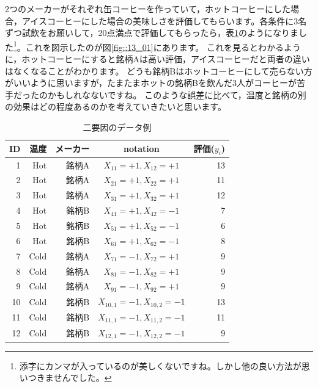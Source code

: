 \documentclass{ltjbook}
\begin{document}
2つのメーカーがそれぞれ缶コーヒーを作っていて，ホットコーヒーにした場合，アイスコーヒーにした場合の美味しさを評価してもらいます。各条件に3名ずつ試飲をお願いして，20点満点で評価してもらったら，表\ref{tbl::13_01}のようになりました\footnote{添字にカンマが入っているのが美しくないですね。しかし他の良い方法が思いつきませんでした。}。これを図示したのが図\ref{fig::13_01}にあります。
これを見るとわかるように，ホットコーヒーにすると銘柄Aは高い評価，アイスコーヒーだと両者の違いはなくなることがわかります。
どうも銘柄Bはホットコーヒーにして売らない方がいいように思いますが，たまたまホットの銘柄Bを飲んだ3人がコーヒーが苦手だったのかもしれなないですね。
このような誤差に比べて，温度と銘柄の別の効果はどの程度あるのかを考えていきたいと思います。
\begin{table}[ht]
	\centering
	\caption{二要因のデータ例}
	\begin{tabular}{rrrcr}
		\hline
		ID & 温度 & メーカー & notation                  & 評価($y_{i}$) \\
		\hline
		1  & Hot  & 銘柄A    & $X_{11}=+1,X_{12}=+1$     & 13            \\
		2  & Hot  & 銘柄A    & $X_{21}=+1,X_{22}=+1$     & 11            \\
		3  & Hot  & 銘柄A    & $X_{31}=+1,X_{32}=+1$     & 12            \\
		4  & Hot  & 銘柄B    & $X_{41}=+1,X_{42}=-1$     & 7             \\
		5  & Hot  & 銘柄B    & $X_{51}=+1,X_{52}=-1$     & 6             \\
		6  & Hot  & 銘柄B    & $X_{61}=+1,X_{62}=-1$     & 8             \\
		7  & Cold & 銘柄A    & $X_{71}=-1,X_{72}=+1$     & 9             \\
		8  & Cold & 銘柄A    & $X_{81}=-1,X_{82}=+1$     & 9             \\
		9  & Cold & 銘柄A    & $X_{91}=-1,X_{92}=+1$     & 9             \\
		10 & Cold & 銘柄B    & $X_{10,1}=-1,X_{10,2}=-1$ & 13            \\
		11 & Cold & 銘柄B    & $X_{11,1}=-1,X_{11,2}=-1$ & 11            \\
		12 & Cold & 銘柄B    & $X_{12,1}=-1,X_{12,2}=-1$ & 9             \\
		\hline
	\end{tabular}

	\label{tbl::13_01}
\end{table}
\end{document}

